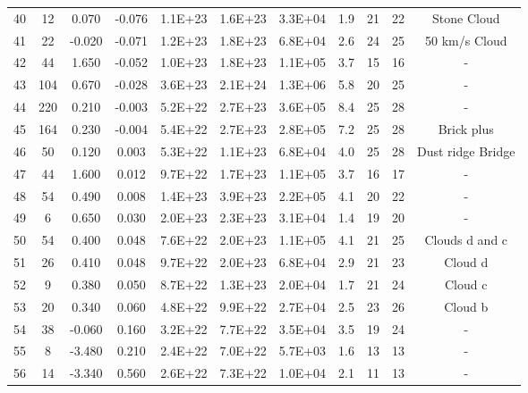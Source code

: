 \begin{tabular}{ccccccccccc}
40 & 12 & 0.070 & -0.076 & 1.1E+23 & 1.6E+23 & 3.3E+04 & 1.9 & 21 & 22 & Stone Cloud \\
41 & 22 & -0.020 & -0.071 & 1.2E+23 & 1.8E+23 & 6.8E+04 & 2.6 & 24 & 25 & 50 km/s Cloud \\
42 & 44 & 1.650 & -0.052 & 1.0E+23 & 1.8E+23 & 1.1E+05 & 3.7 & 15 & 16 & - \\
43 & 104 & 0.670 & -0.028 & 3.6E+23 & 2.1E+24 & 1.3E+06 & 5.8 & 20 & 25 & - \\
44 & 220 & 0.210 & -0.003 & 5.2E+22 & 2.7E+23 & 3.6E+05 & 8.4 & 25 & 28 & - \\
45 & 164 & 0.230 & -0.004 & 5.4E+22 & 2.7E+23 & 2.8E+05 & 7.2 & 25 & 28 & Brick plus \\
46 & 50 & 0.120 & 0.003 & 5.3E+22 & 1.1E+23 & 6.8E+04 & 4.0 & 25 & 28 & Dust ridge Bridge \\
47 & 44 & 1.600 & 0.012 & 9.7E+22 & 1.7E+23 & 1.1E+05 & 3.7 & 16 & 17 & - \\
48 & 54 & 0.490 & 0.008 & 1.4E+23 & 3.9E+23 & 2.2E+05 & 4.1 & 20 & 22 & - \\
49 & 6 & 0.650 & 0.030 & 2.0E+23 & 2.3E+23 & 3.1E+04 & 1.4 & 19 & 20 & - \\
50 & 54 & 0.400 & 0.048 & 7.6E+22 & 2.0E+23 & 1.1E+05 & 4.1 & 21 & 25 & Clouds d and c \\
51 & 26 & 0.410 & 0.048 & 9.7E+22 & 2.0E+23 & 6.8E+04 & 2.9 & 21 & 23 & Cloud d \\
52 & 9 & 0.380 & 0.050 & 8.7E+22 & 1.3E+23 & 2.0E+04 & 1.7 & 21 & 24 & Cloud c \\
53 & 20 & 0.340 & 0.060 & 4.8E+22 & 9.9E+22 & 2.7E+04 & 2.5 & 23 & 26 & Cloud b \\
54 & 38 & -0.060 & 0.160 & 3.2E+22 & 7.7E+22 & 3.5E+04 & 3.5 & 19 & 24 & - \\
55 & 8 & -3.480 & 0.210 & 2.4E+22 & 7.0E+22 & 5.7E+03 & 1.6 & 13 & 13 & - \\
56 & 14 & -3.340 & 0.560 & 2.6E+22 & 7.3E+22 & 1.0E+04 & 2.1 & 11 & 13 & - \\
\end{tabular}
